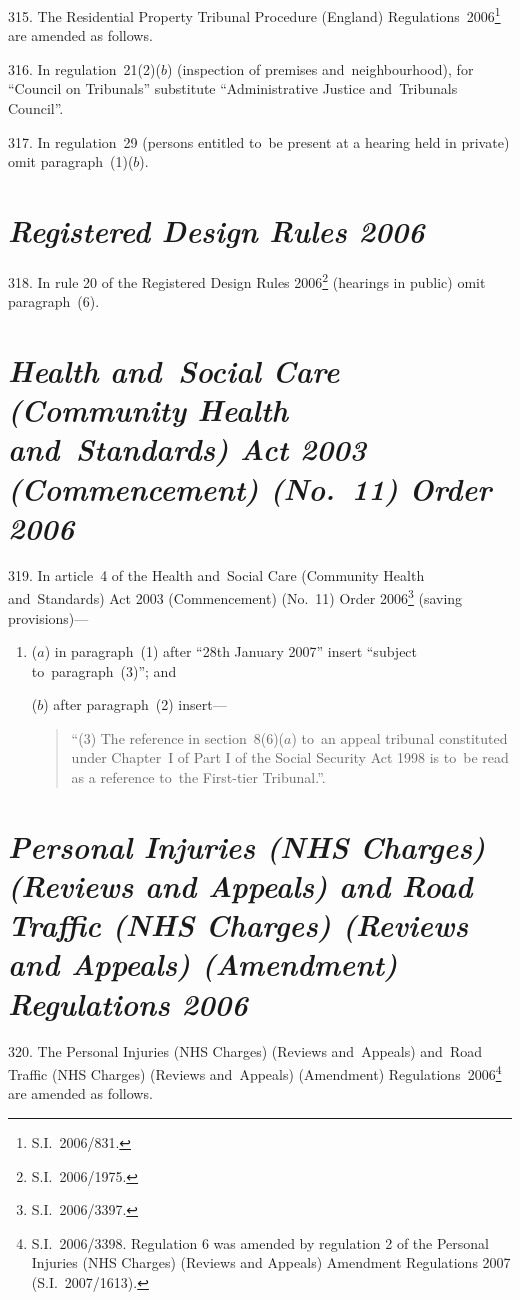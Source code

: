 \documentclass[12pt,a4paper]{article}
\begin{document}
315.  The Residential Property Tribunal Procedure (England) Regulations~2006\footnote{S.I.~2006/831.} are amended as follows.

\medskip

316.  In regulation~21(2)($b$)  (inspection of premises and~neighbourhood), for “Council on Tribunals” substitute “Administrative Justice and~Tribunals Council”.

\medskip

317.  In regulation~29 (persons entitled to~be present at a hearing held in private) omit paragraph~(1)($b$).

\section*{\itshape Registered Design Rules 2006}

318.  In rule 20 of the Registered Design Rules 2006\footnote{S.I.~2006/1975.} (hearings in public) omit paragraph~(6).

\section*{\itshape Health and~Social Care (Community Health and~Standards) Act 2003 (Commencement) (No.~11) Order 2006}

319.  In article~4 of the Health and~Social Care (Community Health and~Standards) Act 2003 (Commencement) (No.~11) Order 2006\footnote{S.I.~2006/3397.} (saving provisions)—
\begin{enumerate}\item[]
($a$) in paragraph~(1) after “28th January 2007” insert “subject to~paragraph~(3)”; and

($b$) after paragraph~(2) insert—
\begin{quotation}
“(3) The reference in section~8(6)($a$)  to~an appeal tribunal constituted under Chapter~I of Part I of the Social Security Act 1998 is to~be read as a reference to~the First-tier Tribunal.”.
\end{quotation}
\end{enumerate}

\section*{\itshape\sloppy{} Personal Injuries (NHS Charges) (Reviews and Appeals) and Road Traffic (NHS Charges) (Reviews and Appeals) (Amendment) Regulations 2006}

320.  The Personal Injuries (NHS Charges) (Reviews and~Appeals) and~Road Traffic (NHS Charges) (Reviews and~Appeals) (Amendment) Regulations~2006\footnote{S.I.~2006/3398. Regulation 6 was amended by regulation 2 of the Personal Injuries (NHS Charges) (Reviews and Appeals) Amendment Regulations 2007 (S.I.~2007/1613).} are amended as follows.
\end{document}
